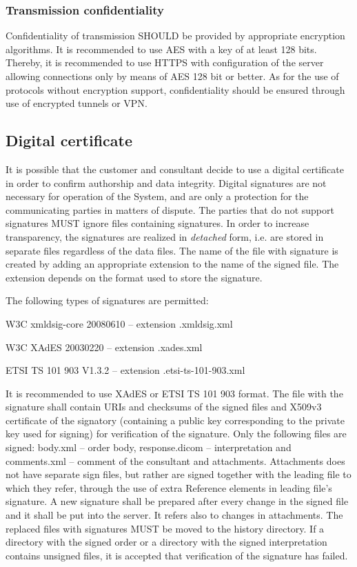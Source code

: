 \documentclass[a4paper]{article}
\begin{document}
\subsubsection{Transmission confidentiality}

Confidentiality of transmission SHOULD be provided by appropriate encryption algorithms. 
It is recommended to use AES with a key of at least 128 bits. Thereby, it is recommended 
to use HTTPS with configuration of the server allowing connections only by means of AES 128 
bit or better. As for the use of protocols without encryption support, confidentiality 
should be ensured through use of encrypted tunnels or VPN.

\subsection{Digital certificate}
\label{sec:sig}

It is possible that the customer and consultant decide to use a digital certificate in order 
to confirm authorship and data integrity. Digital signatures are not necessary for operation 
of the System, and are only a protection for the communicating parties in matters of dispute. 
The parties that do not support signatures MUST ignore files containing signatures. In order 
to increase transparency, the signatures are realized in \emph{detached} form, i.e. are stored 
in separate files regardless of the data files. The name of the file with signature is created 
by adding an appropriate extension to the name of the signed file. The extension depends on 
the format used to store the signature.

The following types of signatures are permitted:
\begin{description}
\item W3C xmldsig-core 20080610 – extension .xmldsig.xml
\item W3C XAdES 20030220 – extension .xades.xml
\item ETSI TS 101 903 V1.3.2 – extension .etsi-ts-101-903.xml      
\end{description}

It is recommended to use XAdES or ETSI TS 101 903 format.
	The file with the signature shall contain URIs and checksums of the signed files and X509v3 certificate of the signatory (containing a public key corresponding to the private key used for signing) for verification of the signature.
	Only the following files are signed: body.xml – order body, response.dicom – interpretation and comments.xml – comment of the consultant and attachments. Attachments does not have separate sign files, but rather are signed together with the leading file to which they refer, through the use of extra Reference elements in leading file's signature.
	A new signature shall be prepared after every change in the signed file and it shall be put into the server. It refers also to changes in attachments. The replaced files with signatures MUST be moved to the history directory.
	If a directory with the signed order or a directory with the signed interpretation contains unsigned files, it is accepted that verification of the signature has failed.
\end{document}
